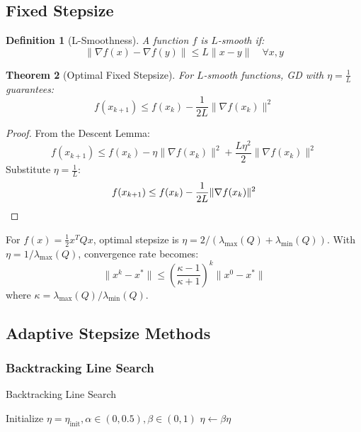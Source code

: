 \documentclass{article}
\newtheorem{theorem}{Theorem}
\newtheorem{definition}[theorem]{Definition}
\begin{document}
\subsection{Fixed Stepsize}
\begin{definition}[L-Smoothness]
A function \( f \) is \( L \)-smooth if:
\[
\|\nabla f(x) - \nabla f(y)\| \leq L\|x - y\| \quad \forall x,y
\]
\end{definition}

\begin{theorem}[Optimal Fixed Stepsize]
For \( L \)-smooth functions, GD with \( \eta = \frac{1}{L} \) guarantees:
\[
f(x_{k+1}) \leq f(x_k) - \frac{1}{2L}\|\nabla f(x_k)\|^2
\]
\end{theorem}

\begin{proof}
From the Descent Lemma:
\[
f(x_{k+1}) \leq f(x_k) - \eta\|\nabla f(x_k)\|^2 + \frac{L\eta^2}{2}\|\nabla f(x_k)\|^2
\]
Substitute \( \eta = \frac{1}{L} \):
\[
f(x_{k+1}) \leq f(x_k) - \frac{1}{2L}\|\nabla f(x_k)\|^2 \qedhere
\]
\end{proof}

\begin{example}
For \( f(x) = \frac{1}{2}x^TQx \), optimal stepsize is \( \eta = 2/(\lambda_{\max}(Q) + \lambda_{\min}(Q)) \). With \( \eta = 1/\lambda_{\max}(Q) \), convergence rate becomes:
\[
\|x^k - x^*\| \leq \left(\frac{\kappa-1}{\kappa+1}\right)^k \|x^0 - x^*\|
\]
where \( \kappa = \lambda_{\max}(Q)/\lambda_{\min}(Q) \).
\end{example}

\subsection{Adaptive Stepsize Methods}

\subsubsection{Backtracking Line Search}
\begin{algorithm}[H]
\caption{Backtracking Line Search}
\begin{algorithmic}[1]
\State Initialize \( \eta = \eta_{\text{init}}, \alpha \in (0,0.5), \beta \in (0,1) \)
\State \( \eta \gets \beta\eta \)
\EndWhile
\end{algorithmic}
\end{algorithm}
\end{document}
